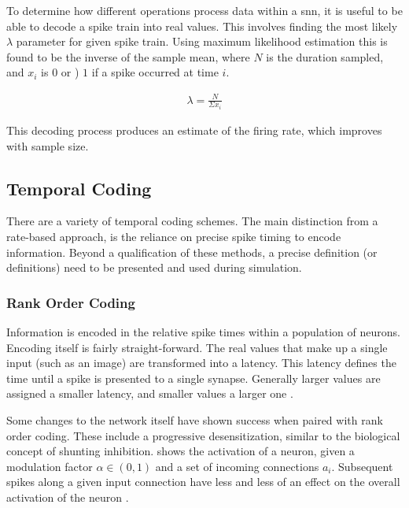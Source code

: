     
    
    To determine how different operations process data within a \gls{snn}, it is
    useful to be able to decode a spike train into real values. This involves
    finding the most likely $\lambda$ parameter for given spike train. Using
    maximum likelihood estimation this is found to be the inverse of the sample
    mean, where $N$ is the duration sampled, and $x_i$ is $0$ or ) $1$ if a
    spike occurred at time $i$.
    
    \begin{align}
        \lambda = \frac{N}{\Sigma x_i}
    \end{align}
    
    This decoding process produces an estimate of the firing rate, which
    improves with sample size.
    
    \subsection{Temporal Coding}
    There are a variety of temporal coding schemes. The main distinction from a
    rate-based approach, is the reliance on precise spike timing to encode
    information. Beyond a qualification of these methods, a precise definition
    (or definitions) need to be presented and used during simulation.
    
    \subsubsection{Rank Order Coding}
    Information is encoded in the relative spike times within a population of
    neurons. Encoding itself is fairly straight-forward. The real values that
    make up a single input (such as an image) are transformed into a
    latency. This latency defines the time until a spike is presented to a
    single synapse. Generally larger values are assigned a smaller latency, and
    smaller values a larger one \parencite{delorme_2001}.
    
    Some changes to the network itself have shown success when paired with rank
    order coding. These include a progressive desensitization, similar to the
    biological concept of shunting inhibition. 
    shows the activation of a neuron, given a modulation factor
    $\alpha \in (0,1)$ and a set of incoming connections $a_i$. Subsequent spikes along a
    given input connection have less and less of an effect on the overall
    activation of the neuron \parencite{delorme_2001}.
    
